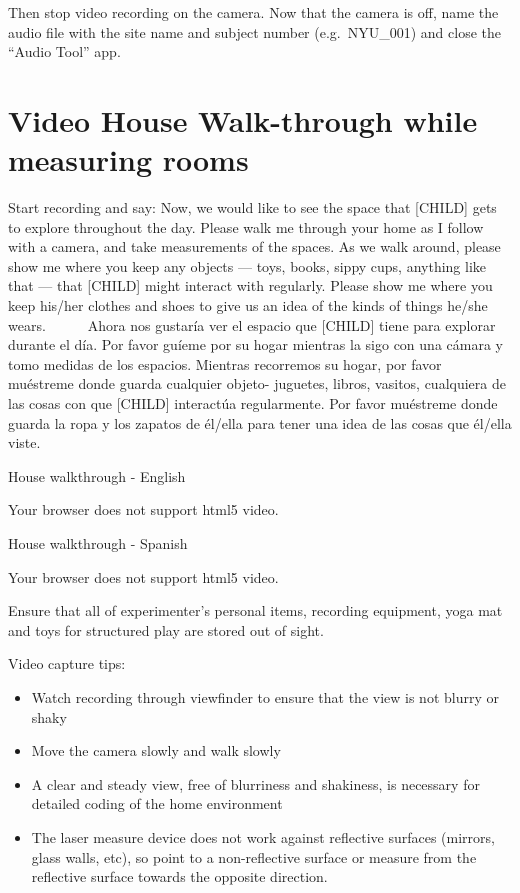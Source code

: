 \documentclass[
]{book}
\providecommand{\tightlist}{%
  \setlength{\itemsep}{0pt}\setlength{\parskip}{0pt}}
\begin{document}
Then stop video recording on the camera. Now that the camera is off, name the audio file with the site name and subject number (e.g.~NYU\_001) and close the ``Audio Tool'' app.

\hypertarget{video-house-walk-through-while-measuring-rooms}{%
\section{Video House Walk-through while measuring rooms}\label{video-house-walk-through-while-measuring-rooms}}

Start recording and say: Now, we would like to see the space that {[}CHILD{]} gets to explore throughout the day. Please walk me through your home as I follow with a camera, and take measurements of the spaces. As we walk around, please show me where you keep any objects --- toys, books, sippy cups, anything like that --- that {[}CHILD{]} might interact with regularly. Please show me where you keep his/her clothes and shoes to give us an idea of the kinds of things he/she wears.
    Ahora nos gustaría ver el espacio que {[}CHILD{]} tiene para explorar durante el día. Por favor guíeme por su hogar mientras la sigo con una cámara y tomo medidas de los espacios. Mientras recorremos su hogar, por favor muéstreme donde guarda cualquier objeto- juguetes, libros, vasitos, cualquiera de las cosas con que {[}CHILD{]} interactúa regularmente. Por favor muéstreme donde guarda la ropa y los zapatos de él/ella para tener una idea de las cosas que él/ella viste.

House walkthrough - English

Your browser does not support html5 video.

House walkthrough - Spanish

Your browser does not support html5 video.

Ensure that all of experimenter's personal items, recording equipment, yoga mat and toys for structured play are stored out of sight.

Video capture tips:

\begin{itemize}
\tightlist
\item
  Watch recording through viewfinder to ensure that the view is not blurry or shaky\\
\item
  Move the camera slowly and walk slowly\\
\item
  A clear and steady view, free of blurriness and shakiness, is necessary for detailed coding of the home environment
\item
  The laser measure device does not work against reflective surfaces (mirrors, glass walls, etc), so point to a non-reflective surface or measure from the reflective surface towards the opposite direction.
\end{itemize}
\end{document}
